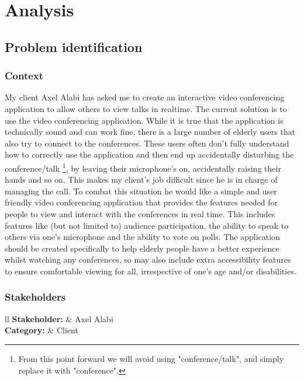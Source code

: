 \pagestyle{fancy}
\chead{\thepage}

\chapter{Analysis}

\section{Problem identification}

\subsection{Context}

My client Axel Alabi has asked me to create an interactive
video conferencing application to allow others to view talks 
in realtime. The current solution is to use the  
video conferencing application. While it is true that the 
application is technically sound and can work fine, there is a
large number of elderly users that also try to connect to the 
conferences. These users often don't fully understand how to 
correctly use the application and then end up accidentally 
disturbing the conference/talk \footnote{From this point 
forward we will avoid using "conference/talk", and simply
replace it with "conference".}, by leaving their microphone's
on, accidentally raising their hands and so on. This makes my
client's job difficult since he is in charge of managing the 
 call. To combat this situation he would like a 
simple and user friendly video conferencing application that
provides the features needed for people to view and interact
with the conferences in real time. This includes 
features like (but not limited to) audience participation,
the ability to speak to others via one's microphone and the
ability to vote on polls. The application should be
created specifically to help elderly people have a better 
experience whilst watching any conferences, so may also
include extra accessibility features to ensure comfortable
viewing for all, irrespective of one's age and/or disabilities.

\subsection{Stakeholders}

\begin{tblr}{ll}
  \textbf{Stakeholder: } & Axel Alabi\\
  \textbf{Category: } & Client\\
\end{tblr}
\vspace{0.2cm}


